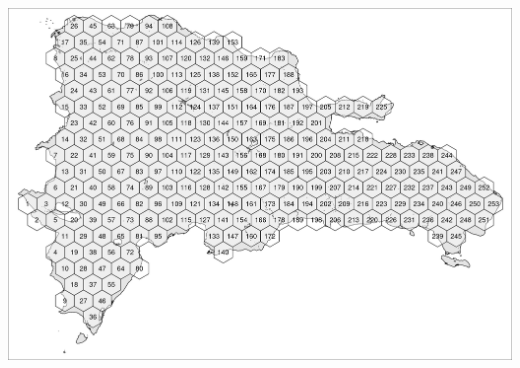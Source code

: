 \documentclass[10pt,landscape,a3paper]{article}
\begin{document}
\begin{center}\includegraphics{img/data-download-preparation-eda/zonal-annual-grid-1} \end{center}
\end{document}
